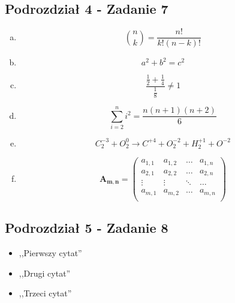 \documentclass{article}
\begin{document}
\subsection{Podrozdział 4 - Zadanie 7}
\begin{enumerate}[a)]
    \item $${n\choose k}=\frac{n!}{k!(n-k)!}$$
    \item $$a^{2}+b^{2}=c^{2}$$
    \item $$\frac{\frac{1}{2}+\frac{1}{4}}{\frac{1}{8}}\neq{1}$$
    \item $$\sum_{i=2}^{n}i^{2}=\frac{n(n+1)(n+2)}{6}$$
    \item $$C^{-3}_{2}+O^{0}_{2}\xrightarrow{}C^{+4}+O^{-2}_{2}+H^{+1}_{2}+O^{-2}$$
    \item $$
    \mathbf{A_{m,n}} =
    \left( \begin{array}{cccc}
    a_{1,1} & a_{1,2} & \ldots & a_{1,n} \\
    a_{2,1} & a_{2,2} & \ldots & a_{2,n}\\
    \vdots & \vdots & \ddots & \ldots\\
    a_{m,1} & a_{m,2} & \ldots & a_{m,n} \\
    \end{array} \right)
    $$
\end{enumerate}

\subsection{Podrozdział 5 - Zadanie 8}
\begin{itemize}
    \item ,,Pierwszy cytat'' \citep{ksiazka1} 
    \item ,,Drugi cytat'' \citep{ksiazka2}
    \item ,,Trzeci cytat'' \citep{ksiazka3}
    \end{itemize}





\end{document}
